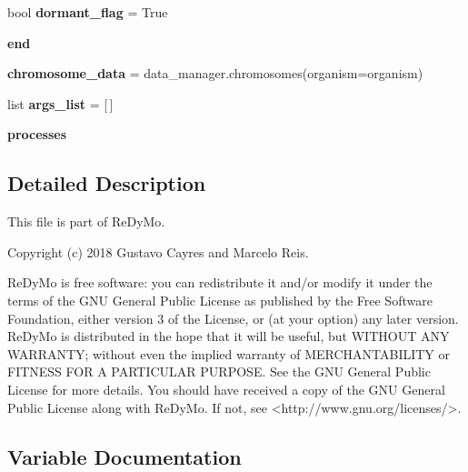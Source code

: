 \begin{DoxyCompactItemize}
\item 
\mbox{\label{namespaceReDyMo_1_1src_1_1main_a05960bb550a6706136d12ba0f54f75e6}} 
bool {\bfseries dormant\+\_\+flag} = True
\item 
\mbox{\label{namespaceReDyMo_1_1src_1_1main_a35c17535260c028a795ffdbb785e5334}} 
{\bfseries end}
\item 
\mbox{\label{namespaceReDyMo_1_1src_1_1main_a18f5c486a1d635b5f6cd4c0785899b06}} 
{\bfseries chromosome\+\_\+data} = data\+\_\+manager.\+chromosomes(organism=organism)
\item 
\mbox{\label{namespaceReDyMo_1_1src_1_1main_a3518e7024aed3c4b3319ec33507e2791}} 
list {\bfseries args\+\_\+list} = \mbox{[}$\,$\mbox{]}
\item 
\mbox{\label{namespaceReDyMo_1_1src_1_1main_a83c574cebdc97a74e31908bc6f96d34b}} 
{\bfseries processes}
\end{DoxyCompactItemize}


\subsection{Detailed Description}
\begin{DoxyVerb}This file is part of ReDyMo.

Copyright (c) 2018  Gustavo Cayres and Marcelo Reis.

ReDyMo is free software: you can redistribute it and/or modify it
under the terms of the GNU General Public License as published by the
Free Software Foundation, either version 3 of the License, or (at your
option) any later version.
ReDyMo is distributed in the hope that it will be useful, but WITHOUT
ANY WARRANTY; without even the implied warranty of MERCHANTABILITY or
FITNESS FOR A PARTICULAR PURPOSE. See the GNU General Public License
for more details.
You should have received a copy of the GNU General Public License along
with ReDyMo. If not, see <http://www.gnu.org/licenses/>.
\end{DoxyVerb}
 

\subsection{Variable Documentation}
\mbox{\label{namespaceReDyMo_1_1src_1_1main_a8c2e35b11b1319a4edfdd0127855fd0a}} 
